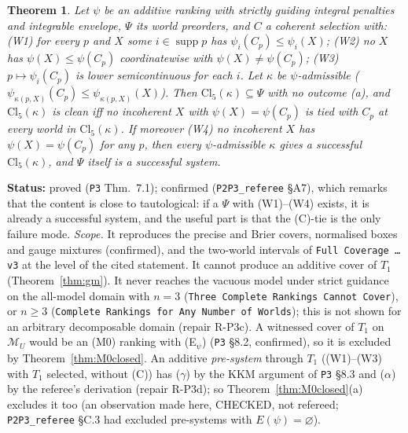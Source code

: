 \documentclass[11pt]{article}
\newtheorem{theorem}{Theorem}[section]
\theoremstyle{definition}
\theoremstyle{remark}
\newcommand{\M}{\mathcal M}
\newcommand{\supp}{\operatorname{supp}}
\newcommand{\src}[1]{\texttt{#1}}
\newcommand{\status}[1]{\par\smallskip\noindent\textbf{Status:} #1\par\smallskip}
\begin{document}
\begin{theorem}\label{thm:witness}
Let $\psi$ be an additive ranking with strictly guiding integral penalties and integrable envelope, $\Psi$ its world preorders, and $C$ a coherent selection with: (W1) for every $p$ and $X$ some $i\in\supp p$ has $\psi_i(C_p)\le\psi_i(X)$; (W2) no $X$ has $\psi(X)\le\psi(C_p)$ coordinatewise with $\psi(X)\ne\psi(C_p)$; (W3) $p\mapsto\psi_i(C_p)$ is lower semicontinuous for each $i$. Let $\kappa$ be $\psi$-admissible ($\psi_{\kappa(p,X)}(C_p)\le\psi_{\kappa(p,X)}(X)$). Then $\mathrm{Cl}_5(\kappa)\subseteq\Psi$ with no outcome (a), and $\mathrm{Cl}_5(\kappa)$ is clean iff no incoherent $X$ with $\psi(X)=\psi(C_p)$ is tied with $C_p$ at every world in $\mathrm{Cl}_5(\kappa)$. If moreover (W4) no incoherent $X$ has $\psi(X)=\psi(C_p)$ for any $p$, then every $\psi$-admissible $\kappa$ gives a successful $\mathrm{Cl}_5(\kappa)$, and $\Psi$ itself is a successful system.
\end{theorem}
\status{proved (\src{P3} Thm.~7.1); confirmed (\src{P2P3\_referee} \S A7), which remarks that the content is close to tautological: if a $\Psi$ with (W1)--(W4) exists, it is already a successful system, and the useful part is that the (C)-tie is the only failure mode. \emph{Scope.} It reproduces the precise and Brier covers, normalised boxes and gauge mixtures (confirmed), and the two-world intervals of \src{Full Coverage \dots v3} at the level of the cited statement. It cannot produce an additive cover of $T_1$ (Theorem~\ref{thm:gm}). It never reaches the vacuous model under strict guidance on the all-model domain with $n=3$ (\src{Three Complete Rankings Cannot Cover}), or $n\ge3$ (\src{Complete Rankings for Any Number of Worlds}); this is not shown for an arbitrary decomposable domain (repair R-P3c). A witnessed cover of $T_1$ on $\M_U$ would be an (M0) ranking with (E$_\psi$) (\src{P3} \S8.2, confirmed), so it is excluded by Theorem~\ref{thm:M0closed}. An additive \emph{pre-system} through $T_1$ ((W1)--(W3) with $T_1$ selected, without (C)) has ($\gamma$) by the KKM argument of \src{P3} \S8.3 and ($\alpha$) by the referee's derivation (repair R-P3d); so Theorem~\ref{thm:M0closed}(a) excludes it too (an observation made here, CHECKED, not refereed; \src{P2P3\_referee} \S C.3 had excluded pre-systems with $E(\psi)=\varnothing$).}
\end{document}
